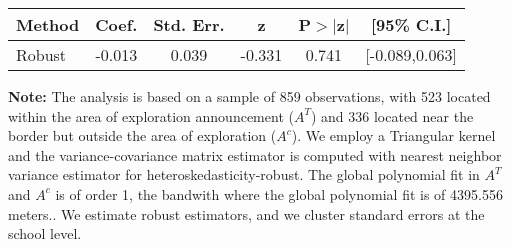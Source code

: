 \begin{table}[htbp]\centering
 \footnotesize 
\begin{tabular}{lccccc}
\hline\hline
Method & Coef. & Std. Err. & z & P$>|$z$|$ & [95\% C.I.] \\ 
\hline \hline  
Robust & -0.013 & 0.039 & -0.331 & 0.741 & [-0.089,0.063] \\ 
  \hline\hline
\end{tabular}
\label{table:rd}
\begin{tablenotes} 
  \justifying \tiny \textbf{Note: }    
   The analysis is based on a sample of 859 observations, with 523 located within the area of exploration announcement ($A^{T}$) and 336 located near the border but outside the area of exploration  ($A^{c}$). 
           We employ a Triangular kernel and the variance-covariance matrix estimator is computed with nearest neighbor variance estimator for heteroskedasticity-robust. The global polynomial fit in  $A^{T}$ and $A^{c}$ is of order 1, the bandwith where the global polynomial fit is of 4395.556 meters.. We estimate robust estimators, and we cluster standard errors at the school level. \end{tablenotes} 
 \end{table} 
